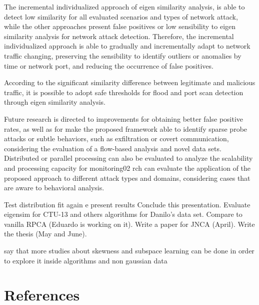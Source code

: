 \documentclass[review]{elsarticle}
\begin{document}
The incremental individualized approach of eigen similarity analysis, is able to detect low similarity for all evaluated scenarios and types of network attack, while the other approaches present false positives or low sensibility to eigen similarity analysis for network attack detection. Therefore, the incremental individualized approach is able to gradually and incrementally adapt to network traffic changing, preserving the sensibility to identify outliers or anomalies by time or network port, and reducing the occurrence of false positives.

According to the significant similarity difference between legitimate and malicious traffic, it is possible to adopt safe thresholds for flood and port scan detection through eigen similarity analysis.

Future research is directed to improvements for obtaining better false positive rates, as well as for make the proposed framework able to identify sparse probe attacks or subtle behaviors, such as exfiltration or covert communication, considering the evaluation of a flow-based analysis and novel data sets. Distributed or parallel processing can also be evaluated to analyze the scalability and processing capacity for monitoring02       rch can evaluate the application of the proposed approach to different attack types and domains, considering cases that are aware to behavioral analysis.

Test distribution fit again e present results 
Conclude this presentation.
Evaluate eigensim for CTU-13 and others algorithms for Danilo's data set.
Compare to vanilla RPCA (Eduardo is working on it).
Write a paper for JNCA (April).
Write the thesis (May and June).

say that more studies about skewness and subspace learning can be done in order to explore it inside algorithms and non gaussian data

\section*{References}


\end{document}
